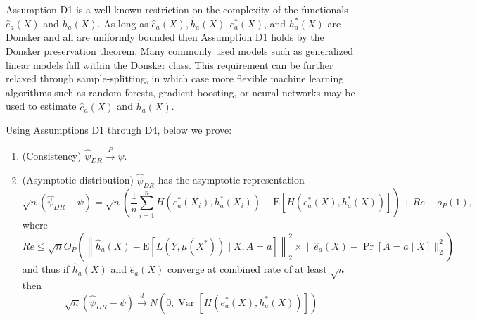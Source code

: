 Assumption D1 is a well-known restriction on the complexity of the functionals $\widehat{e}_a(X)$ and $\widehat{h}_a(X)$. As long as $\widehat{e}_a(X), \widehat{h}_a(X), e^*_a(X)$, and $h^*_a(X)$ are Donsker and all are uniformly bounded then Assumption D1 holds by the Donsker preservation theorem. Many commonly used models such as generalized linear models fall within the Donsker class. This requirement can be further relaxed through sample-splitting, in which case more flexible machine learning algorithms such as random forests, gradient boosting, or neural networks may be used to estimate $\widehat{e}_a(X)$ and $\widehat{h}_a(X)$. 

Using Assumptions D1 through D4, below we prove:
\begin{enumerate}
    \item (Consistency) $\widehat{\psi}_{D R} \stackrel{P}{\longrightarrow} \psi$.
    \item (Asymptotic distribution) $\widehat{\psi}_{D R}$ has the asymptotic representation
    $$
    \sqrt{n}\left(\widehat{\psi}_{D R}-\psi\right)=\sqrt{n}\left(\frac{1}{n} \sum_{i=1}^n H\left(e^*_a(X_i), h^*_a(X_i)\right)-\mathrm{E}\left[H\left(e^*_a(X), h^*_a(X)\right)\right]\right)+R e+o_P(1),
    $$
    where
    $$
    R e \leq \sqrt{n} O_P\left(\left\|\widehat{h}_a(X)-\mathrm{E}\left[L\left(Y, \mu(X^*)\right) \mid X, A=a\right]\right\|_2^2 \times\Big\|\widehat{e}_a(X)-\operatorname{Pr}[A=a \mid X]\Big\|_2^2\right) 
    $$
    and thus if $\widehat{h}_a(X)$ and $\widehat{e}_a(X)$ converge at combined rate of at least $\sqrt{n}$ then
    $$
    \sqrt{n}\left(\widehat{\psi}_{D R}-\psi\right) \stackrel{d}{\longrightarrow} N\left(0, \operatorname{Var}\left[H(e^*_a(X), h^*_a(X))\right]\right)
    $$
\end{enumerate}


